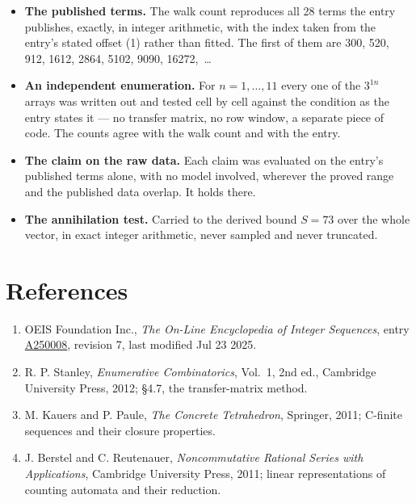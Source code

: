 \documentclass[11pt]{article}
\theoremstyle{definition}
\begin{document}
\begin{itemize}

\item {\bfseries The published terms.} The walk count reproduces all 28 terms the entry publishes, exactly, in integer arithmetic, with the index taken from the entry's stated offset (1) rather than fitted. The first of them are 300, 520, 912, 1612, 2864, 5102, 9090, 16272,~\dots

\item {\bfseries An independent enumeration.} For $n = 1,\dots,11$ every one of the $3^{1n}$ arrays was written out and tested cell by cell against the condition as the entry states it --- no transfer matrix, no row window, a separate piece of code. The counts agree with the walk count and with the entry.

\item {\bfseries The claim on the raw data.} Each claim was evaluated on the entry's published terms alone, with no model involved, wherever the proved range and the published data overlap. It holds there.

\item {\bfseries The annihilation test.} Carried to the derived bound $S = 73$ over the whole vector, in exact integer arithmetic, never sampled and never truncated.

\end{itemize}

\section{References}

\begin{enumerate}

\item OEIS Foundation Inc., \emph{The On-Line Encyclopedia of Integer Sequences}, entry \href{https://oeis.org/A250008}{A250008}, revision 7, last modified Jul 23 2025.

\item R. P. Stanley, \emph{Enumerative Combinatorics}, Vol.~1, 2nd ed., Cambridge University Press, 2012; \S4.7, the transfer-matrix method.

\item M. Kauers and P. Paule, \emph{The Concrete Tetrahedron}, Springer, 2011; C-finite sequences and their closure properties.

\item J. Berstel and C. Reutenauer, \emph{Noncommutative Rational Series with Applications}, Cambridge University Press, 2011; linear representations of counting automata and their reduction.

\end{enumerate}
\end{document}
